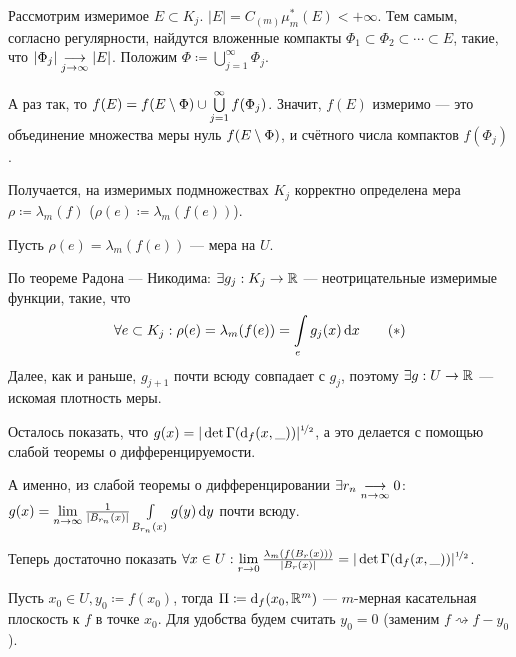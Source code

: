 \documentclass[a4paper]{report}
\begin{document}
{{            Рассмотрим измеримое $E \subset K_j$. $|E| = C_{(m)}\mu_m^*(E) < +\infty$.
            Тем самым, согласно регулярности, найдутся вложенные компакты $\Phi_1 \subset \Phi_2 \subset \cdots \subset E$, такие, что $|\Phi_j| \underset{j \to \infty}{\longrightarrow} |E|$.
            Положим $\Phi \coloneqq \bigcup\limits_{j = 1}^{\infty}\Phi_j$.

            А раз так, то $f(E) = f(E \setminus \Phi) \cup \bigcup\limits_{j = 1}^{\infty}f(\Phi_j)$.
            Значит, $f(E)$ измеримо --- это объединение множества меры нуль $f(E \setminus \Phi)$, и счётного числа компактов $f(\Phi_j)$.

            Получается, на измеримых подмножествах $K_j$ корректно определена мера $\rho \coloneqq \lambda_m(f)$ ($\rho(e) \coloneqq \lambda_m(f(e))$).

            \item Пусть $\rho(e) = \lambda_m(f(e))$ --- мера на $U$.

            По теореме Радона --- Никодима: $\exists g_j: K_j \rightarrow \mathbb{R}$ --- неотрицательные измеримые функции, такие, что
            \[\forall e \subset K_j: \rho(e) = \lambda_m(f(e)) = \int\limits_{e}g_j(x)\operatorname{d}\! x\label{density}\tag{$*$}\]
            Далее, как и раньше, $g_{j + 1}$ почти всюду совпадает с $g_j$, поэтому $\exists g: U \rightarrow \mathbb{R}$ --- искомая плотность меры.

            \item Осталось показать, что $g(x) = |\det \Gamma(\operatorname{d}\!_f(x, \_))|^{\nicefrac12}$, а это делается с помощью слабой теоремы о дифференцируемости.

            А именно, из слабой теоремы о дифференцировании $\exists r_n \underset{n \to \infty}{\longrightarrow} 0$: $g(x) = \lim\limits_{n \to \infty}\frac{1}{|B_{r_n}(x)|}\int\limits_{B_{r_n}(x)}g(y) \operatorname{d}\! y$ почти всюду.

            Теперь достаточно показать $\forall x \in U: \lim\limits_{r \to 0}\frac{\lambda_m(f(B_r(x)))}{|B_r(x)|} = |\det \Gamma(\operatorname{d}\!_f(x, \_))|^{\nicefrac12}$.

            Пусть $x_0 \in U, y_0 \coloneqq f(x_0)$, тогда $\Pi \coloneqq \operatorname{d}\!_f(x_0, \mathbb{R}^m)$ --- $m$-мерная касательная плоскость к $f$ в точке $x_0$.
            Для удобства будем считать $y_0 = 0$ (заменим $f \rightsquigarrow f - y_0$).

}}
\end{document}
